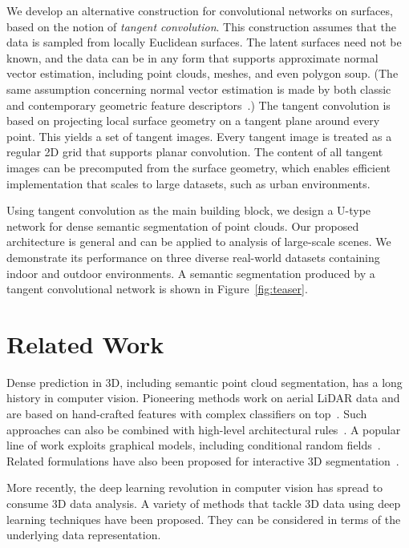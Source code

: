 \documentclass[10pt,twocolumn,letterpaper]{article}
\begin{document}
We develop an alternative construction for convolutional networks on surfaces, based on the notion of \emph{tangent convolution}. This construction assumes that the data is sampled from locally Euclidean surfaces. The latent surfaces need not be known, and the data can be in any form that supports approximate normal vector estimation, including point clouds, meshes, and even polygon soup. (The same assumption concerning normal vector estimation is made by both classic and contemporary geometric feature descriptors~\cite{JohnsonHebert1999,Frome2004,Rusu2009,Tombari2010b,Salti2014,khoury17}.)
The tangent convolution is based on projecting local surface geometry on a tangent plane around every point. This yields a set of tangent images. Every tangent image is treated as a regular 2D grid that supports planar convolution. The content of all tangent images can be precomputed from the surface geometry, which enables efficient implementation that scales to large datasets, such as urban environments.


Using tangent convolution as the main building block, we design a U-type network for dense semantic segmentation of point clouds.
Our proposed architecture is general and can be applied to analysis of large-scale scenes.
We demonstrate its performance on three diverse real-world datasets containing indoor and outdoor environments.
A semantic segmentation produced by a tangent convolutional network is shown in Figure~\ref{fig:teaser}.
 
\section{Related Work}
\label{sec:related_work}
Dense prediction in 3D, including semantic point cloud segmentation, has a long history in computer vision.
Pioneering methods work on aerial LiDAR data and are based on hand-crafted features with complex classifiers on top~\cite{charaniya04,chehata09,golovinskiy09}.
Such approaches can also be combined with high-level architectural rules~\cite{martinovic15}.
A popular line of work exploits graphical models, including conditional random fields~\cite{munoz09,floros12,anand13,wu14,hermans14,kundu14,vineet15}.
Related formulations have also been proposed for interactive 3D segmentation~\cite{Valentin2015,miksik15}.

More recently, the deep learning revolution in computer vision has spread to consume 3D data analysis. A variety of methods that tackle 3D data using deep learning techniques have been proposed. They can be considered in terms of the underlying data representation.
\end{document}
